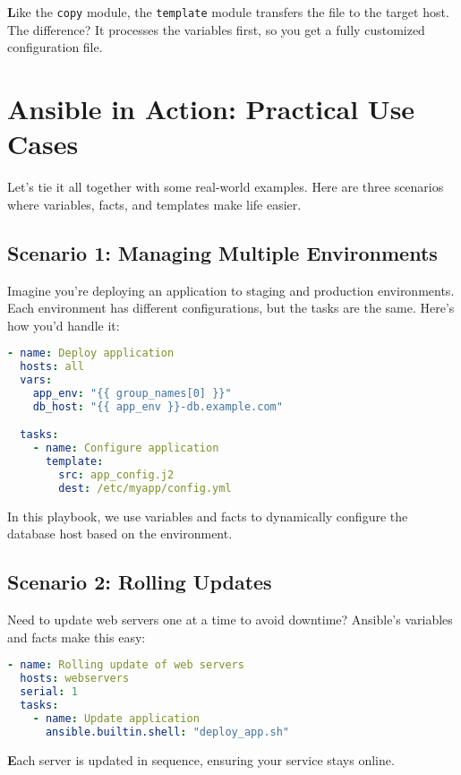 \textbf{L}ike the \texttt{copy} module, the \texttt{template} module transfers the file to the target host. The difference? It processes the variables first, so you get a fully customized configuration file.


\section{Ansible in Action: Practical Use Cases}

Let's tie it all together with some real-world examples. Here are three scenarios where variables, facts, and templates make life easier.

\subsection{Scenario 1: Managing Multiple Environments}

Imagine you're deploying an application to staging and production environments. Each environment has different configurations, but the tasks are the same. Here's how you'd handle it:
\begin{lstlisting}[language=yaml, caption=Playbook for Multiple Environments]
- name: Deploy application
  hosts: all
  vars:
    app_env: "{{ group_names[0] }}"
    db_host: "{{ app_env }}-db.example.com"

  tasks:
    - name: Configure application
      template:
        src: app_config.j2
        dest: /etc/myapp/config.yml
\end{lstlisting}

In this playbook, we use variables and facts to dynamically configure the database host based on the environment.

\subsection{Scenario 2: Rolling Updates}

Need to update web servers one at a time to avoid downtime? Ansible's variables and facts make this easy:
\begin{lstlisting}[language=yaml, caption=Rolling Updates Playbook]
- name: Rolling update of web servers
  hosts: webservers
  serial: 1
  tasks:
    - name: Update application
      ansible.builtin.shell: "deploy_app.sh"
\end{lstlisting}

\textbf{E}ach server is updated in sequence, ensuring your service stays online.

